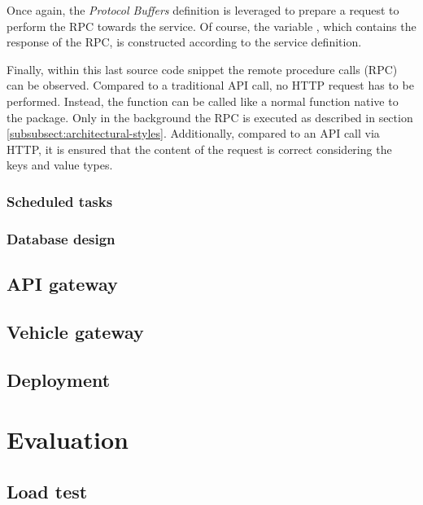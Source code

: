 \documentclass[12pt,a4paper,twoside]{report}
\begin{document}
Once again, the \textit{Protocol Buffers} definition is leveraged to prepare
a request to perform the RPC towards the  service.
Of course, the variable , which contains the response of the RPC,
is constructed according to the service definition.

Finally, within this last source code snippet the remote procedure calls (RPC)
can be observed. Compared to a traditional API call, no HTTP request has to be
performed. Instead, the function 
can be called like a normal function native to the package.
Only in the background the RPC is executed as described
in section \ref{subsubsect:architectural-styles}.
Additionally, compared to an API call via HTTP, it is ensured that the content
of the request is correct considering the keys and value types.

\subsection{Scheduled tasks}



\subsection{Database design}




\section{API gateway}




\section{Vehicle gateway}




\section{Deployment}





\chapter{Evaluation} \label{chap:evaluation}

\section{Load test}
\end{document}
